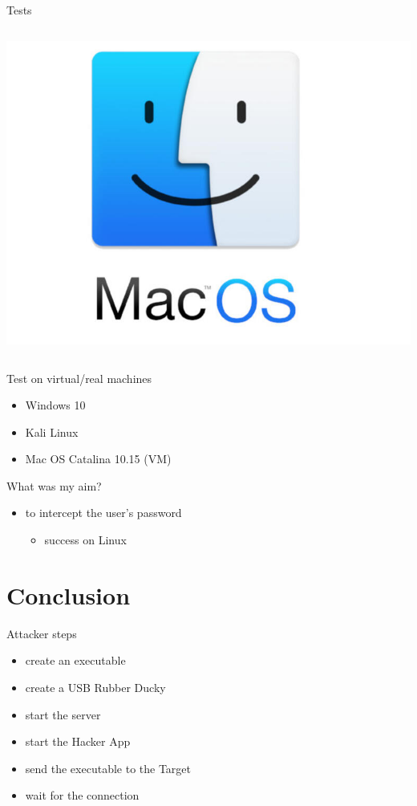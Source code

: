 \documentclass{beamer}
\begin{document}
\begin{frame}{Tests}
\begin{columns}
	\includegraphics[scale=0.55]{../images/macosimg}
\end{columns}
\end{frame}

\begin{frame}{Test on virtual/real machines}
\begin{itemize}
	\item Windows 10
	\item Kali Linux
	\item Mac OS Catalina 10.15 (VM)
\end{itemize}
\vspace{2em}
What was my aim?
\begin{itemize}
	\item to intercept the user's password
	\begin{itemize}
		\item success on Linux
	\end{itemize}
\end{itemize}
\end{frame}


\section{Conclusion}
\begin{frame}{Attacker steps}
\begin{itemize}
	\item create an executable
	\item create a USB Rubber Ducky
	\item start the server
	\item start the Hacker App
	\item send the executable to the Target
	\item wait for the connection
\end{itemize}
\end{frame}
\end{document}
